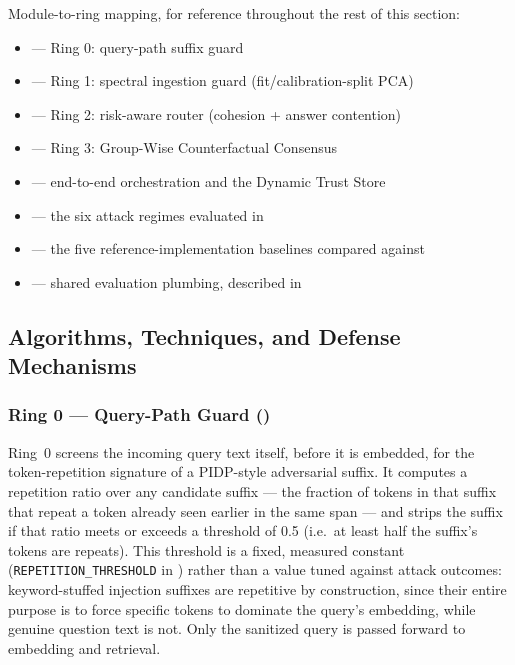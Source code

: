 Module-to-ring mapping, for reference throughout the rest of this
section:

\begin{itemize}
\item {} --- Ring 0: query-path suffix guard
\item {} --- Ring 1: spectral ingestion guard (fit/calibration-split PCA)
\item {} --- Ring 2: risk-aware router (cohesion + answer contention)
\item {} --- Ring 3: Group-Wise Counterfactual Consensus
\item {} --- end-to-end orchestration and the Dynamic Trust Store
\item {} --- the six attack regimes evaluated in 
\item {} --- the five reference-implementation baselines compared against
\item {} --- shared evaluation plumbing, described in 
\end{itemize}

\subsection{Algorithms, Techniques, and Defense Mechanisms}

\subsubsection{Ring 0 --- Query-Path Guard ()}

Ring~0 screens the incoming query text itself, before it is embedded, for
the token-repetition signature of a PIDP-style adversarial suffix. It
computes a repetition ratio over any candidate suffix --- the fraction of
tokens in that suffix that repeat a token already seen earlier in the
same span --- and strips the suffix if that ratio meets or exceeds a
threshold of 0.5 (i.e.\ at least half the suffix's tokens are repeats).
This threshold is a fixed, measured constant (\texttt{REPETITION\_THRESHOLD}
in ) rather than a value tuned against attack
outcomes: keyword-stuffed injection suffixes are repetitive by
construction, since their entire purpose is to force specific tokens to
dominate the query's embedding, while genuine question text is not. Only
the sanitized query is passed forward to embedding and retrieval.

